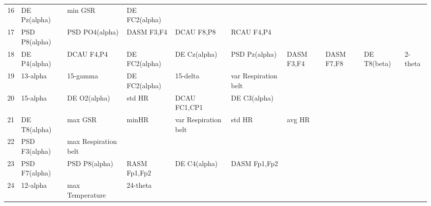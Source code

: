 \begin{landscape}
\begin{table}[]
\begin{tabular}{l|llllllll}
16       & DE Pz(alpha)          & min GSR               & DE FC2(alpha)        &                         &                         &                      &                      &                       &                       &                    \\
17       & PSD P8(alpha)         & PSD PO4(alpha)        & DASM F3,F4           & DCAU F8,P8              & RCAU F4,P4              &                      &                      &                       &                       &                    \\
18       & DE P4(alpha)          & DCAU F4,P4            & DE FC2(alpha)        & DE Cz(alpha)            & PSD Pz(alpha)           & DASM F3,F4           & DASM F7,F8           & DE T8(beta)           & 2-theta               &                    \\
19       & 13-alpha              & 15-gamma              & DE FC2(alpha)        & 15-delta                & var Respiration belt    &                      &                      &                       &                       &                    \\
20       & 15-alpha              & DE O2(alpha)          & std HR               & DCAU FC1,CP1            & DE C3(alpha)            &                      &                      &                       &                       &                    \\
21       & DE T8(alpha)          & max GSR               & minHR                & var Respiration belt    & std HR                  & avg HR               &                      &                       &                       &                    \\
22       & PSD F3(alpha)         & max Respiration belt  &                      &                         &                         &                      &                      &                       &                       &                    \\
23       & PSD F7(alpha)         & PSD P8(alpha)         & RASM Fp1,Fp2         & DE C4(alpha)            & DASM Fp1,Fp2            &                      &                      &                       &                       &                    \\
24       & 12-alpha              & max Temperature       & 24-theta             &                         &                         &                      &                      &                       &                       &                    \\

\end{tabular}
\end{table}
\end{landscape}
